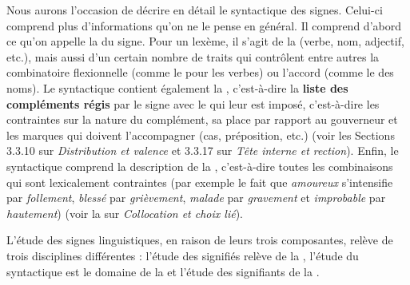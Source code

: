 Nous aurons l’occasion de décrire en détail le syntactique des signes. Celui-ci comprend plus d’informations qu’on ne le pense en général. Il comprend d’abord ce qu’on appelle la  du signe. Pour un lexème, il s’agit de la  (verbe, nom, adjectif, etc.), mais aussi d’un certain nombre de traits qui contrôlent entre autres la combinatoire flexionnelle (comme le  pour les verbes) ou l’accord (comme le  des noms). Le syntactique contient également la , c’est-à-dire la \textbf{liste des compléments régis} par le signe avec le  qui leur est imposé, c’est-à-dire les contraintes sur la nature du complément, sa place par rapport au gouverneur et les marques qui doivent l’accompagner (cas, préposition, etc.) (voir les Sections 3.3.10 sur \textit{Distribution et valence} et 3.3.17 sur \textit{Tête interne et rection}). Enfin, le syntactique comprend la description de la , c’est-à-dire toutes les combinaisons qui sont lexicalement contraintes (par exemple le fait que \textit{amoureux} s’intensifie par \textit{follement}, \textit{blessé} par \textit{grièvement}, \textit{malade} par \textit{gravement} et \textit{improbable} par \textit{hautement}) (voir la  sur \textit{Collocation et choix lié}).

L’étude des signes linguistiques, en raison de leurs trois composantes, relève de trois disciplines différentes : l’étude des signifiés relève de la , l’étude du syntactique est le domaine de la  et l’étude des signifiants de la .

